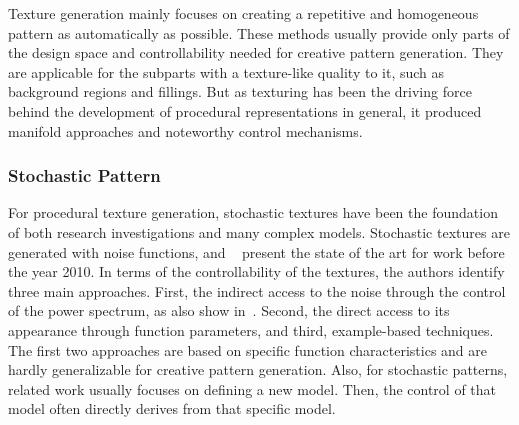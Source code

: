 Texture generation mainly focuses on creating a repetitive and homogeneous pattern as automatically as possible. These methods usually provide only parts of the design space and controllability needed for creative pattern generation. They are applicable for the subparts with a texture-like quality to it, such as background regions and fillings. But as texturing has been the driving force behind the development of procedural representations in general, it produced manifold approaches and noteworthy control mechanisms. 

\subsubsection{Stochastic Pattern}
\label{subsubsec:analysis_distribution_and_repetition_stochastic}

For procedural texture generation, stochastic textures have been the foundation of both research investigations and many complex models. Stochastic textures are generated with noise functions, and \citeauthor*{lagae_2010_sap}~\cite{lagae_2010_sap} present the state of the art for work before the year 2010.  In terms of the controllability of the textures, the authors identify three main approaches. First, the indirect access to the noise through the control of the power spectrum, as also show in~. Second, the direct access to its appearance through function parameters, and third, example-based techniques. The first two approaches are based on specific function characteristics and are hardly generalizable for creative pattern generation. Also, for stochastic patterns, related work usually focuses on defining a new model. Then, the control of that model often directly derives from that specific model.

